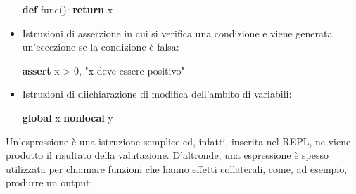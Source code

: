 \documentclass[
  letterpaper,
]{scrbook}
\newenvironment{Shaded}{\begin{snugshade}}{\end{snugshade}}
\newcommand{\ControlFlowTok}[1]{\textcolor[rgb]{0.00,0.23,0.31}{\textbf{#1}}}
\newcommand{\DecValTok}[1]{\textcolor[rgb]{0.68,0.00,0.00}{#1}}
\newcommand{\KeywordTok}[1]{\textcolor[rgb]{0.00,0.23,0.31}{\textbf{#1}}}
\newcommand{\NormalTok}[1]{\textcolor[rgb]{0.00,0.23,0.31}{#1}}
\newcommand{\OperatorTok}[1]{\textcolor[rgb]{0.37,0.37,0.37}{#1}}
\newcommand{\StringTok}[1]{\textcolor[rgb]{0.13,0.47,0.30}{#1}}
\begin{document}
\begin{itemize}
\begin{Shaded}
\begin{Highlighting}[]
\KeywordTok{def}\NormalTok{ func():}
    \ControlFlowTok{return}\NormalTok{ x}
\end{Highlighting}
\end{Shaded}
\item
  Istruzioni di asserzione in cui si verifica una condizione e viene
  generata un'eccezione se la condizione è falsa:

\begin{Shaded}
\begin{Highlighting}[]
\ControlFlowTok{assert}\NormalTok{ x }\OperatorTok{\textgreater{}} \DecValTok{0}\NormalTok{, }\StringTok{"x deve essere positivo"}
\end{Highlighting}
\end{Shaded}
\item
  Istruzioni di diichiarazione di modifica dell'ambito di variabili:

\begin{Shaded}
\begin{Highlighting}[]
\KeywordTok{global}\NormalTok{ x}
\KeywordTok{nonlocal}\NormalTok{ y}
\end{Highlighting}
\end{Shaded}
\end{itemize}

Un'espressione è una istruzione semplice ed, infatti, inserita nel REPL,
ne viene prodotto il risultato della valutazione. D'altronde, una
espressione è spesso utilizzata per chiamare funzioni che hanno effetti
collaterali, come, ad esempio, produrre un output:
\end{document}
